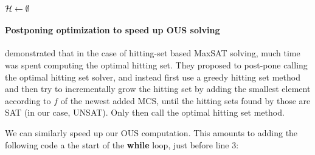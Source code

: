 \begin{algorithm}[ht]
  \DontPrintSemicolon
  $\mathcal{H}   \gets \emptyset$ \; %
  \While{true}{
    $\F' \gets \ohs(\setstohit,f) $ \label{smus-hs} \;%
    \If{ $\lnot \sat(\F')$}{
      \Return{$\F'$} \;
    }
    $\F'' \gets  \grow(\F',\F) $\;
    $\setstohit  \gets \setstohit  \cup \{  \formula \setminus \F''\}$ \;
  }
  \caption{$\omus(\formula,f)$ }
  \label{alg:omus}
\end{algorithm}

\paragraph{Postponing optimization to speed up OUS solving}
\citet{davies} demonstrated that in the case of hitting-set based MaxSAT solving, much time was spent computing the optimal hitting set. They proposed to post-pone calling the optimal hitting set solver, and instead first use a greedy hitting set method and then try to incrementally grow the hitting set by adding the smallest element according to $f$ of the newest added MCS, until the hitting sets found by those are SAT (in our case, UNSAT). Only then call the optimal hitting set method.

We can similarly speed up our OUS computation. This amounts to adding the following code a the start of the \textbf{while} loop, just before line $3$:
\begin{algorithm}[ht]
\end{algorithm}


